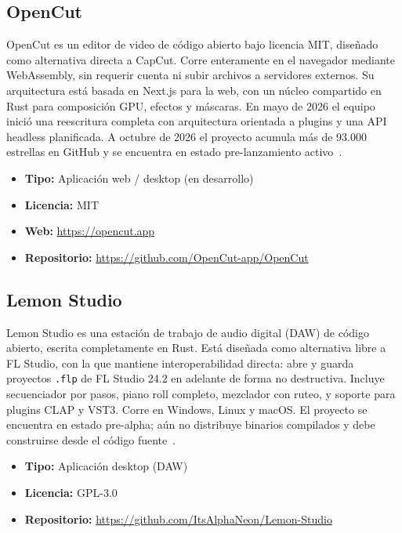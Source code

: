 \documentclass[conference]{IEEEtran}
\begin{document}
\subsection{OpenCut}

OpenCut es un editor de video de código abierto bajo licencia MIT,
diseñado como alternativa directa a CapCut. Corre enteramente en el
navegador mediante WebAssembly, sin requerir cuenta ni subir archivos
a servidores externos. Su arquitectura está basada en Next.js para la
web, con un núcleo compartido en Rust para composición GPU, efectos y
máscaras. En mayo de 2026 el equipo inició una reescritura completa
con arquitectura orientada a plugins y una API headless planificada.
A octubre de 2026 el proyecto acumula más de 93.000 estrellas en GitHub
y se encuentra en estado pre-lanzamiento activo~\cite{opencut}.

\begin{itemize}
  \item \textbf{Tipo:} Aplicación web / desktop (en desarrollo)
  \item \textbf{Licencia:} MIT
  \item \textbf{Web:} \url{https://opencut.app}
  \item \textbf{Repositorio:} \url{https://github.com/OpenCut-app/OpenCut}
\end{itemize}

\subsection{Lemon Studio}

Lemon Studio es una estación de trabajo de audio digital (DAW)
de código abierto, escrita completamente en Rust. Está diseñada
como alternativa libre a FL Studio, con la que mantiene
interoperabilidad directa: abre y guarda proyectos \texttt{.flp}
de FL Studio 24.2 en adelante de forma no destructiva. Incluye
secuenciador por pasos, piano roll completo, mezclador con ruteo,
y soporte para plugins CLAP y VST3. Corre en Windows, Linux y
macOS. El proyecto se encuentra en estado pre-alpha; aún no
distribuye binarios compilados y debe construirse desde el código
fuente~\cite{lemonstudio}.

\begin{itemize}
  \item \textbf{Tipo:} Aplicación desktop (DAW)
  \item \textbf{Licencia:} GPL-3.0
  \item \textbf{Repositorio:} \url{https://github.com/ItsAlphaNeon/Lemon-Studio}
\end{itemize}
\end{document}
